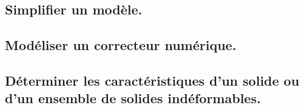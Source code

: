 \documentclass[10pt,fleqn]{book}
\newcommand{\repRel}{../..}
\newcommand{\repStyle}{\repRel/Style}
\newcommand{\td}{fichier_td}
\newcommand{\repExos}{\repRel/ExercicesCompetences}
\newcommand{\repExo}{dossier}
\begin{document}
\begin{multicols}{2}
\renewcommand{\repExo}{\repExos/B2_ProposerModele/B2_07_ModelisationSchemaBlocs/77_ProtheseTibia}
\renewcommand{\td}{77_ProtheseTibia}
\graphicspath{{\repStyle/png/}{\repExo/images/}}


\renewcommand{\repExo}{\repExos/B2_ProposerModele/B2_07_ModelisationSchemaBlocs/78_RobotDaVinci}
\renewcommand{\td}{78_RobotDaVinci}
\graphicspath{{\repStyle/png/}{\repExo/images/}}


\renewcommand{\repExo}{\repExos/B2_ProposerModele/B2_07_ModelisationSchemaBlocs/79_Tuyere}
\renewcommand{\td}{79_Tuyere}
\graphicspath{{\repStyle/png/}{\repExo/images/}}


\renewcommand{\repExo}{\repExos/B2_ProposerModele/B2_07_ModelisationSchemaBlocs/80_Clever}
\renewcommand{\td}{80_Clever}
\graphicspath{{\repStyle/png/}{\repExo/images/}}


\end{multicols}

\subsection{Simplifier un modèle.} 

\begin{multicols}{2} 

\end{multicols}

\subsection{Modéliser un correcteur numérique. } 

\begin{multicols}{2} 

\end{multicols}

\subsection{Déterminer les caractéristiques d'un solide ou d'un ensemble de solides indéformables.} 
\end{document}
